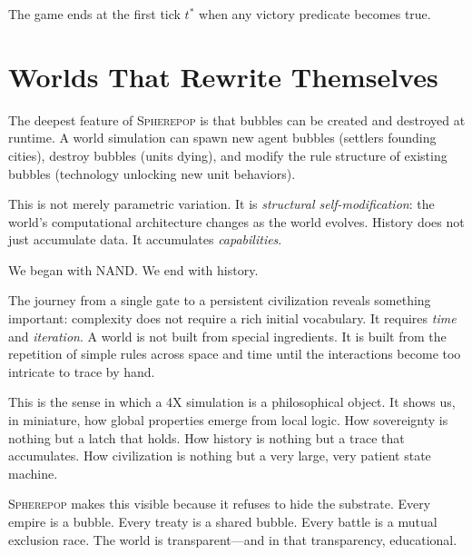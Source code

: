 \documentclass[11pt,a4paper,openany]{book}
\theoremstyle{plain}
\theoremstyle{definition}
\theoremstyle{remark}
\newenvironment{perspective}{%
  \begin{mdframed}[
    linecolor=spherered!40, backgroundcolor=spherered!4,
    linewidth=1pt, innertopmargin=8pt, innerbottommargin=8pt,
    innerleftmargin=10pt, innerrightmargin=10pt,
    skipabove=10pt, skipbelow=6pt
  ]%
  \setlength{\parindent}{0pt}%
  \noindent{\textcolor{spherered}{\textbf{Perspective}}}\par\smallskip\ignorespaces
}{\end{mdframed}}
\newcommand{\Sp}{\textsc{Spherepop}\xspace}
\newcommand{\Spbox}{\textsc{Spherepop}\xspace}
\newcommand{\Spbox}{\textbf{Spherepop}\xspace}
\begin{document}
The game ends at the first tick $t^*$ when any victory predicate becomes true.

\section{Worlds That Rewrite Themselves}

The deepest feature of \Sp{} is that bubbles can be created and destroyed
at runtime. A world simulation can spawn new agent bubbles (settlers
founding cities), destroy bubbles (units dying), and modify the rule
structure of existing bubbles (technology unlocking new unit behaviors).

This is not merely parametric variation. It is \emph{structural
self-modification}: the world's computational architecture changes as the
world evolves. History does not just accumulate data. It accumulates
\emph{capabilities}.

\begin{perspective}
  We began with NAND. We end with history.

  The journey from a single gate to a persistent civilization reveals
  something important: complexity does not require a rich initial
  vocabulary. It requires \emph{time} and \emph{iteration}. A world
  is not built from special ingredients. It is built from the repetition
  of simple rules across space and time until the interactions become
  too intricate to trace by hand.

  This is the sense in which a 4X simulation is a philosophical object.
  It shows us, in miniature, how global properties emerge from local
  logic. How sovereignty is nothing but a latch that holds. How history
  is nothing but a trace that accumulates. How civilization is nothing
  but a very large, very patient state machine.

  \Spbox  makes this visible because it refuses to hide the substrate.
  Every empire is a bubble. Every treaty is a shared bubble. Every battle
  is a mutual exclusion race. The world is transparent---and in that
  transparency, educational.
\end{perspective}
\end{document}
